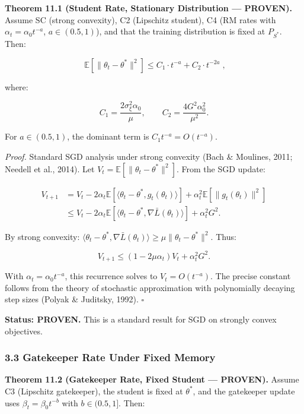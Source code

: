 \documentclass[
  12pt,
]{article}
\begin{document}
\textbf{Theorem 11.1 (Student Rate, Stationary Distribution ---
PROVEN).} Assume SC (strong convexity), C2 (Lipschitz student), C4 (RM
rates with \(\alpha_t = \alpha_0 t^{-a}\), \(a \in (0.5, 1)\)), and that
the training distribution is fixed at \(P_{S^*}\). Then:

\[\boxed{\;\mathbb{E}[\|\theta_t - \theta^*\|^2] \leq C_1 \cdot t^{-a} + C_2 \cdot t^{-2a}\;},\]

where:

\[C_1 = \frac{2\sigma_\xi^2 \alpha_0}{\mu}, \qquad C_2 = \frac{4 G^2 \alpha_0^2}{\mu^2}.\]

For \(a \in (0.5, 1)\), the dominant term is \(C_1 t^{-a} = O(t^{-a})\).

\emph{Proof.} Standard SGD analysis under strong convexity (Bach \&
Moulines, 2011; Needell et al., 2014). Let
\(V_t = \mathbb{E}[\|\theta_t - \theta^*\|^2]\). From the SGD update:

\[\begin{aligned}
V_{t+1} &= V_t - 2\alpha_t \mathbb{E}[\langle \theta_t - \theta^*, g_t(\theta_t) \rangle] + \alpha_t^2 \mathbb{E}[\|g_t(\theta_t)\|^2] \\
&\leq V_t - 2\alpha_t \mathbb{E}[\langle \theta_t - \theta^*, \nabla \bar{L}(\theta_t) \rangle] + \alpha_t^2 G^2.
\end{aligned}\]

By strong convexity:
\(\langle \theta_t - \theta^*, \nabla \bar{L}(\theta_t) \rangle \geq \mu \|\theta_t - \theta^*\|^2\).
Thus:

\[V_{t+1} \leq (1 - 2\mu \alpha_t) V_t + \alpha_t^2 G^2.\]

With \(\alpha_t = \alpha_0 t^{-a}\), this recurrence solves to
\(V_t = O(t^{-a})\). The precise constant follows from the theory of
stochastic approximation with polynomially decaying step sizes (Polyak
\& Juditsky, 1992). \(\square\)

\textbf{Status: PROVEN.} This is a standard result for SGD on strongly
convex objectives.

\subsubsection{3.3 Gatekeeper Rate Under Fixed
Memory}\label{gatekeeper-rate-under-fixed-memory}

\textbf{Theorem 11.2 (Gatekeeper Rate, Fixed Student --- PROVEN).}
Assume C3 (Lipschitz gatekeeper), the student is fixed at \(\theta^*\),
and the gatekeeper update uses \(\beta_t = \beta_0 t^{-b}\) with
\(b \in (0.5, 1]\). Then:
\end{document}
